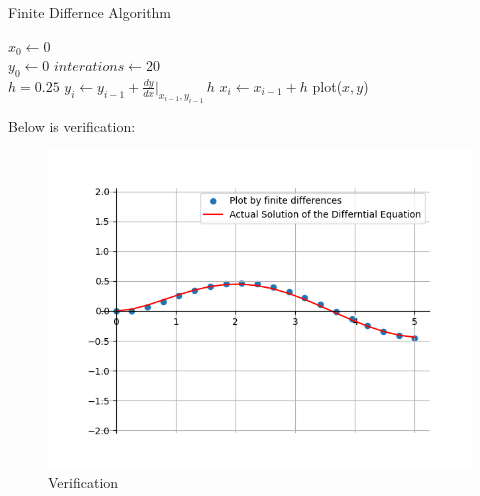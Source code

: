 \documentclass[journal]{IEEEtran}
\begin{document}
\begin{enumerate}
    \begin{algorithm}[!h]
        \caption{Finite Differnce Algorithm}
        \begin{algorithmic}
            \STATE {} $x_0 \gets 0$\\
            \STATE $y_0 \gets 0$
            \STATE {} $interations \gets 20$\\
            \STATE {} $h = 0.25$
                \STATE $\displaystyle y_{i} \gets y_{i-1} + \frac{dy}{dx}|_{x_{i-1}, y_{i-1}} \, h$
                \STATE $x_i \gets x_{i-1} + h$
            \ENDFOR
            \STATE plot($x, y$)
        \end{algorithmic}
    \end{algorithm}
    Below is verification:
    \begin{figure}  %
        \centering  %
        \includegraphics[width=\columnwidth]{figs/fig1.png}  
        \caption{Verification}
    \end{figure}


\end{enumerate}
\end{document}
